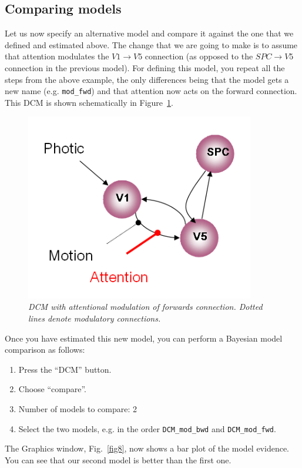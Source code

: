 \subsection{Comparing models}

Let us now specify an alternative model and compare it against the one that we defined and estimated above. The change that we are going to make is to assume that attention modulates the $V1 \rightarrow V5$ connection (as opposed to the $SPC \rightarrow V5$ connection in the previous model). For defining this model, you repeat all the steps from the above example, the only differences being that the model gets a new name (e.g. \verb!mod_fwd!) and that attention now acts on the forward connection. This DCM is shown schematically in Figure~\ref{fwd}.
\begin{figure}[ht]
\begin{center}
\includegraphics[width=100mm]{dcm/dcm_mod_fwd}
\caption{\em DCM with attentional modulation of forwards connection. Dotted lines denote modulatory connections.\label{fwd}}
\end{center}
\end{figure}
Once you have estimated this new model, you can perform a Bayesian model comparison as follows:
\begin{enumerate}
\item{Press the ``DCM'' button.}
\item{Choose ``compare''.}
\item{Number of models to compare: 2}
\item{Select the two models, e.g. in the order \verb!DCM_mod_bwd! and \verb!DCM_mod_fwd!.}
\end{enumerate}

The Graphics window, Fig.~\ref{fig8}, now shows a bar plot of the model evidence. You can see that our second model is better than the first one. 

